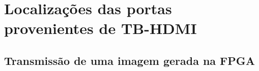 {\tiny \chapter{Localizações das portas provenientes de TB-HDMI} \label{ap3:LOCs}}

\section{Transmissão de uma imagem gerada na FPGA} \label{ap3:imagemFPGA_TX}


